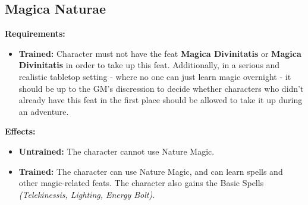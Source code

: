 \subsection{Magica Naturae}
\begin{table}[!ht]
\centering
{}
\end{table}
\textbf{Requirements:}
\begin{itemize}
	\item \textbf{Trained:} Character must not have the feat \textbf{Magica Divinitatis} or \textbf{Magica Divinitatis} in order to take up this feat. Additionally, in a serious and realistic tabletop setting - where no one can just learn magic overnight - it should be up to the GM's discression to decide whether characters who didn't already have this feat in the first place should be allowed to take it up during an adventure.
\end{itemize}
\textbf{Effects:}
\begin{itemize}
	\item \textbf{Untrained:} The character cannot use Nature Magic.
	\item \textbf{Trained:} The character can use Nature Magic, and can learn spells and other magic-related feats. The character also gains the Basic Spells \textit{(Telekinessis, Lighting, Energy Bolt)}.
\end{itemize}\newpage
